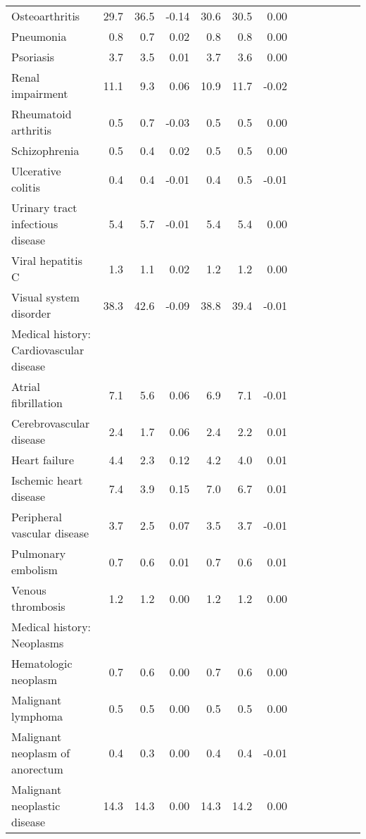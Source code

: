 \documentclass[11pt,]{article}
\begin{document}
\begin{longtable}{lrrrrrrrrrrrr}
      Osteoarthritis & 29.7 & 36.5 & -0.14 & 30.6 & 30.5 &  0.00 \\ 
      Pneumonia &  0.8 &  0.7 &  0.02 &  0.8 &  0.8 &  0.00 \\ 
      Psoriasis &  3.7 &  3.5 &  0.01 &  3.7 &  3.6 &  0.00 \\ 
      Renal impairment & 11.1 &  9.3 &  0.06 & 10.9 & 11.7 & -0.02 \\ 
      Rheumatoid arthritis &  0.5 &  0.7 & -0.03 &  0.5 &  0.5 &  0.00 \\ 
      Schizophrenia &  0.5 &  0.4 &  0.02 &  0.5 &  0.5 &  0.00 \\ 
      Ulcerative colitis &  0.4 &  0.4 & -0.01 &  0.4 &  0.5 & -0.01 \\ 
      Urinary tract infectious disease &  5.4 &  5.7 & -0.01 &  5.4 &  5.4 &  0.00 \\ 
      Viral hepatitis C &  1.3 &  1.1 &  0.02 &  1.2 &  1.2 &  0.00 \\ 
      Visual system disorder & 38.3 & 42.6 & -0.09 & 38.8 & 39.4 & -0.01 \\ 
  Medical history: Cardiovascular disease &    &    &     &    &    &     \\ 
      Atrial fibrillation &  7.1 &  5.6 &  0.06 &  6.9 &  7.1 & -0.01 \\ 
      Cerebrovascular disease &  2.4 &  1.7 &  0.06 &  2.4 &  2.2 &  0.01 \\ 
      Heart failure &  4.4 &  2.3 &  0.12 &  4.2 &  4.0 &  0.01 \\ 
      Ischemic heart disease &  7.4 &  3.9 &  0.15 &  7.0 &  6.7 &  0.01 \\ 
      Peripheral vascular disease &  3.7 &  2.5 &  0.07 &  3.5 &  3.7 & -0.01 \\ 
      Pulmonary embolism &  0.7 &  0.6 &  0.01 &  0.7 &  0.6 &  0.01 \\ 
      Venous thrombosis &  1.2 &  1.2 &  0.00 &  1.2 &  1.2 &  0.00 \\ 
  Medical history: Neoplasms &    &    &     &    &    &     \\ 
      Hematologic neoplasm &  0.7 &  0.6 &  0.00 &  0.7 &  0.6 &  0.00 \\ 
      Malignant lymphoma &  0.5 &  0.5 &  0.00 &  0.5 &  0.5 &  0.00 \\ 
      Malignant neoplasm of anorectum &  0.4 &  0.3 &  0.00 &  0.4 &  0.4 & -0.01 \\ 
      Malignant neoplastic disease & 14.3 & 14.3 &  0.00 & 14.3 & 14.2 &  0.00 \\ 

\end{longtable}
\end{document}
